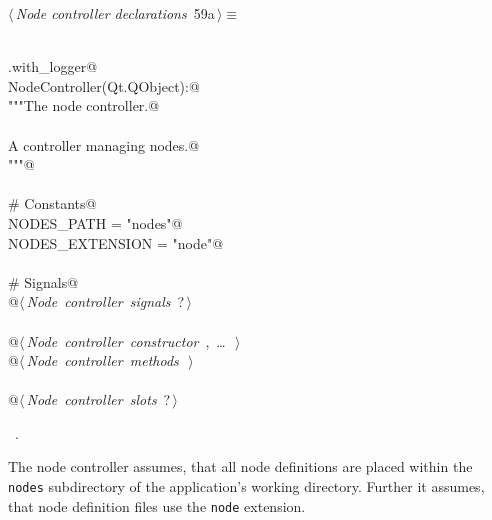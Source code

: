 \documentclass[
    a4paper,      %
    10pt,         %
    openright,    %
    notitlepage,  %
    parskip=half, %
]{scrreprt}       %
\theoremstyle{definition}                    %
\begin{document}
\begin{flushleft} \small
\begin{minipage}{\linewidth}\label{scrap97}\raggedright\small
{} $\langle\,${\itshape Node controller declarations}\nobreak\ {\footnotesize {59a}}$\,\rangle\equiv$
\vspace{-1ex}
\begin{list}{}{} \item
\mbox{}\lstinline@@\\
\mbox{}\lstinline@common.with_logger@\\
\mbox{}\lstinline@class NodeController(Qt.QObject):@\\
\mbox{}\lstinline@    """The node controller.@\\
\mbox{}\lstinline@@\\
\mbox{}\lstinline@    A controller managing nodes.@\\
\mbox{}\lstinline@    """@\\
\mbox{}\lstinline@@\\
\mbox{}\lstinline@    # Constants@\\
\mbox{}\lstinline@    NODES_PATH = "nodes"@\\
\mbox{}\lstinline@    NODES_EXTENSION = "node"@\\
\mbox{}\lstinline@@\\
\mbox{}\lstinline@    # Signals@\\
\mbox{}\lstinline@    @\hbox{$\langle\,${\itshape Node controller signals}\nobreak\ {\footnotesize ?}$\,\rangle$}\lstinline@@\\
\mbox{}\lstinline@@\\
\mbox{}\lstinline@    @\hbox{$\langle\,${\itshape Node controller constructor}\nobreak\ {\footnotesize {}, \ldots\ }$\,\rangle$}\lstinline@@\\
\mbox{}\lstinline@    @\hbox{$\langle\,${\itshape Node controller methods}\nobreak\ {\footnotesize {}}$\,\rangle$}\lstinline@@\\
\mbox{}\lstinline@@\\
\mbox{}\lstinline@    @\hbox{$\langle\,${\itshape Node controller slots}\nobreak\ {\footnotesize ?}$\,\rangle$}\lstinline@@\\
\mbox{}\lstinline@@{\NWsep}
\end{list}
\vspace{-1.5ex}
\footnotesize
\begin{list}{}{\setlength{\itemsep}{-\parsep}\setlength{\itemindent}{-\leftmargin}}
\item \NWtxtMacroRefIn\ .

\item{}
\end{list}
\end{minipage}\vspace{4ex}
\end{flushleft}
The node controller assumes, that all node definitions are placed within the
\verb+nodes+ subdirectory of the application's working directory. Further it
assumes, that node definition files use the \verb+node+ extension.
\end{document}

